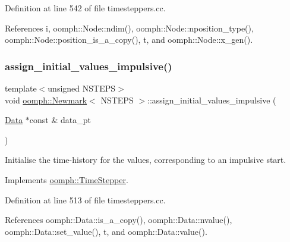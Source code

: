 Definition at line 542 of file timesteppers.\+cc.



References i, oomph\+::\+Node\+::ndim(), oomph\+::\+Node\+::nposition\+\_\+type(), oomph\+::\+Node\+::position\+\_\+is\+\_\+a\+\_\+copy(), t, and oomph\+::\+Node\+::x\+\_\+gen().

\mbox{\label{classoomph_1_1Newmark_a97195b87c11688ae6c17f1a5d2f821e1}} 
\subsubsection{\texorpdfstring{assign\+\_\+initial\+\_\+values\+\_\+impulsive()}{assign\_initial\_values\_impulsive()}}
{\footnotesize\ttfamily template$<$unsigned N\+S\+T\+E\+PS$>$ \\
void \hyperlink{classoomph_1_1Newmark}{oomph\+::\+Newmark}$<$ N\+S\+T\+E\+PS $>$\+::assign\+\_\+initial\+\_\+values\+\_\+impulsive (\begin{DoxyParamCaption}\item[{\hyperlink{classoomph_1_1Data}{Data} $\ast$const \&}]{data\+\_\+pt }\end{DoxyParamCaption})\hspace{0.3cm}{\ttfamily [virtual]}}



Initialise the time-\/history for the values, corresponding to an impulsive start. 



Implements \hyperlink{classoomph_1_1TimeStepper_a7e894df13c88c96dd8eced2700228225}{oomph\+::\+Time\+Stepper}.



Definition at line 513 of file timesteppers.\+cc.



References oomph\+::\+Data\+::is\+\_\+a\+\_\+copy(), oomph\+::\+Data\+::nvalue(), oomph\+::\+Data\+::set\+\_\+value(), t, and oomph\+::\+Data\+::value().

\mbox{\label{classoomph_1_1Newmark_a47895694925d86886ecd03a7e37906fa}} 
